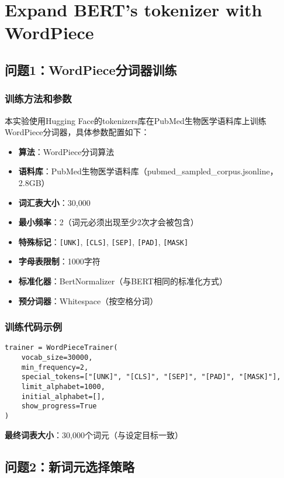 \documentclass[12pt,letterpaper]{article}
\begin{document}
\section{Expand BERT’s tokenizer with WordPiece}
\subsection{问题1：WordPiece分词器训练}

\subsubsection{训练方法和参数}

本实验使用Hugging Face的tokenizers库在PubMed生物医学语料库上训练WordPiece分词器，具体参数配置如下：

\begin{itemize}
    \item \textbf{算法}：WordPiece分词算法
    \item \textbf{语料库}：PubMed生物医学语料库（pubmed\_sampled\_corpus.jsonline，2.8GB）
    \item \textbf{词汇表大小}：30,000
    \item \textbf{最小频率}：2（词元必须出现至少2次才会被包含）
    \item \textbf{特殊标记}：\texttt{[UNK]}, \texttt{[CLS]}, \texttt{[SEP]}, \texttt{[PAD]}, \texttt{[MASK]}
    \item \textbf{字母表限制}：1000字符
    \item \textbf{标准化器}：BertNormalizer（与BERT相同的标准化方式）
    \item \textbf{预分词器}：Whitespace（按空格分词）
\end{itemize}

\subsubsection{训练代码示例}

\begin{verbatim}
trainer = WordPieceTrainer(
    vocab_size=30000,
    min_frequency=2,
    special_tokens=["[UNK]", "[CLS]", "[SEP]", "[PAD]", "[MASK]"],
    limit_alphabet=1000,
    initial_alphabet=[],
    show_progress=True
)
\end{verbatim}

\textbf{最终词表大小}：30,000个词元（与设定目标一致）

\subsection{问题2：新词元选择策略}
\end{document}
